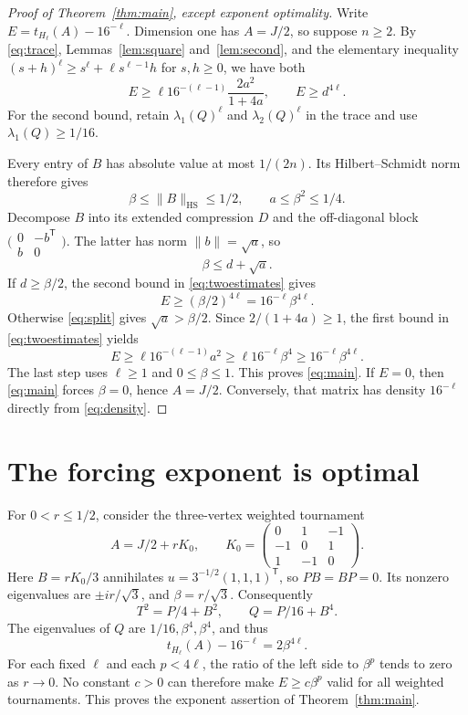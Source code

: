 \documentclass[acmsmall,screen,nonacm,11pt]{acmart}
\newcommand{\norm}[1]{\lVert #1\rVert}
\begin{document}
\begin{proof}[Proof of Theorem~\ref{thm:main}, except exponent optimality]
Write $E=t_{H_\ell}(A)-16^{-\ell}$. Dimension one has $A=J/2$, so suppose $n\geq2$. By \eqref{eq:trace}, Lemmas~\ref{lem:square} and~\ref{lem:second}, and the elementary inequality $(s+h)^\ell\geq s^\ell+\ell s^{\ell-1}h$ for $s,h\geq0$, we have both
\begin{equation}\label{eq:twoestimates}
 E\geq \ell16^{-(\ell-1)}\frac{2a^2}{1+4a},
 \qquad E\geq d^{4\ell}.
\end{equation}
For the second bound, retain $\lambda_1(Q)^\ell$ and $\lambda_2(Q)^\ell$ in the trace and use $\lambda_1(Q)\geq1/16$.

Every entry of $B$ has absolute value at most $1/(2n)$. Its Hilbert--Schmidt norm therefore gives
\[
 \beta\leq\norm{B}_{\mathrm{HS}}\leq1/2,
 \qquad a\leq\beta^2\leq1/4.
\]
Decompose $B$ into its extended compression $D$ and the off-diagonal block $\bigl(\begin{smallmatrix}0&-b^{\mathsf T}\\b&0\end{smallmatrix}\bigr)$. The latter has norm $\norm{b}=\sqrt a$, so
\begin{equation}\label{eq:split}
 \beta\leq d+\sqrt a.
\end{equation}
If $d\geq\beta/2$, the second bound in \eqref{eq:twoestimates} gives
\[
 E\geq(\beta/2)^{4\ell}=16^{-\ell}\beta^{4\ell}.
\]
Otherwise \eqref{eq:split} gives $\sqrt a>\beta/2$. Since $2/(1+4a)\geq1$, the first bound in \eqref{eq:twoestimates} yields
\[
 E\geq\ell16^{-(\ell-1)}a^2
   \geq\ell16^{-\ell}\beta^4
   \geq16^{-\ell}\beta^{4\ell}.
\]
The last step uses $\ell\geq1$ and $0\leq\beta\leq1$. This proves \eqref{eq:main}. If $E=0$, then \eqref{eq:main} forces $\beta=0$, hence $A=J/2$. Conversely, that matrix has density $16^{-\ell}$ directly from \eqref{eq:density}.
\end{proof}

\section{The forcing exponent is optimal}

For $0<r\leq1/2$, consider the three-vertex weighted tournament
\[
 A=J/2+rK_0,\qquad
 K_0=\begin{pmatrix}0&1&-1\\-1&0&1\\1&-1&0\end{pmatrix}.
\]
Here $B=rK_0/3$ annihilates $u=3^{-1/2}(1,1,1)^{\mathsf T}$, so $PB=BP=0$. Its nonzero eigenvalues are $\pm ir/\sqrt3$, and $\beta=r/\sqrt3$. Consequently
\[
 T^2=P/4+B^2,\qquad Q=P/16+B^4.
\]
The eigenvalues of $Q$ are $1/16,\beta^4,\beta^4$, and thus
\begin{equation}\label{eq:sharp}
 t_{H_\ell}(A)-16^{-\ell}=2\beta^{4\ell}.
\end{equation}
For each fixed $\ell$ and each $p<4\ell$, the ratio of the left side to $\beta^p$ tends to zero as $r\to0$. No constant $c>0$ can therefore make $E\geq c\beta^p$ valid for all weighted tournaments. This proves the exponent assertion of Theorem~\ref{thm:main}.
\end{document}
